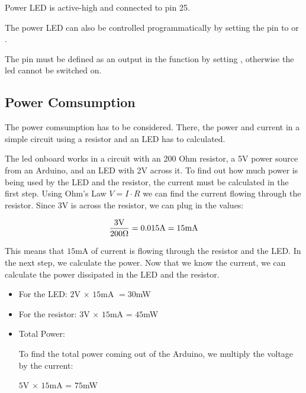 Power LED is active-high and connected to pin 25.

The power LED can also be controlled programmatically by setting the pin to  or . 


The pin must be defined as an output in the function  by setting , otherwise the \ac{led} cannot be switched on.

\medskip 



\subsection{Power Comsumption}\label{LEDPowerComsumption}

The power comsumption has to be considered. There, the power and current in a simple circuit using a resistor and an LED has to calculated.

The led onboard works in a circuit with an 200 Ohm resistor, a 5V power source from an Arduino, and an LED with 2V across it. To find out how much power is being used by the LED and the resistor, the current must be calculated in the first step. Using Ohm's Law $V = I \cdot R$ we can find the current flowing through the resistor. Since 3V is across the resistor, we can plug in the values:

\medskip

$$\frac{3\hbox{V}}{200 \Omega} = 0.015 \hbox{A} = 15\hbox{mA}$$

\medskip

This means that $15$mA of current is flowing through the resistor and the LED. In the next step, we calculate the power. Now that we know the current, we can calculate the power dissipated in the LED and the resistor.

\begin{itemize}
  \item For the LED: $2$V $\times$ $15$mA $= 30$mW
  \item For the resistor: $3$V $\times$ $15$mA = $45$mW
  \item Total Power:

     To find the total power coming out of the Arduino, we multiply the voltage by the current:

              $5$V $\times$ $15$mA = $75$mW
\end{itemize}

